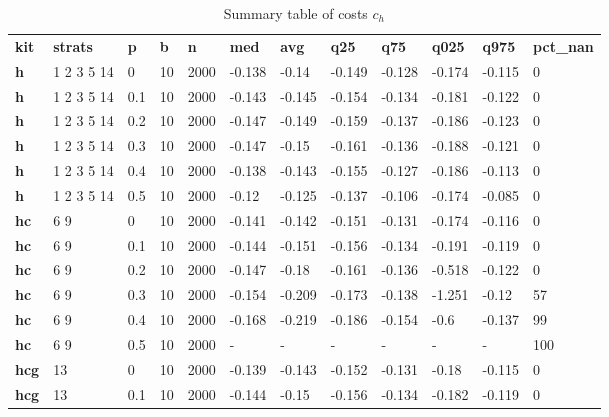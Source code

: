 \begin{longtable}[h]{|p{0.8cm}|p{1.5cm}|p{1cm}|p{1cm}|p{1cm}|p{1cm}|p{1cm}|p{1cm}|p{1cm}|p{1cm}|p{1cm}|p{1.5cm}|}
\caption{Summary table of costs $c_h$}
\label{tab:costs_mod_h} \\
      \hline
\textbf{ kit} & \textbf{ strats} & \textbf{ p} & \textbf{ b} & \textbf{ n} & \textbf{ med} & \textbf{ avg} & \textbf{ q25} & \textbf{ q75} & \textbf{ q025} & \textbf{ q975} & \textbf{ pct\_nan}
           \\
  \textbf{h   } &  1 2 3 5 14 &   0 & 10 & 2000 & -0.138 &  -0.14 & -0.149 & -0.128 & -0.174 & -0.115 &   0
           \\
  \textbf{h   } &  1 2 3 5 14 & 0.1 & 10 & 2000 & -0.143 & -0.145 & -0.154 & -0.134 & -0.181 & -0.122 &   0
           \\
  \textbf{h   } &  1 2 3 5 14 & 0.2 & 10 & 2000 & -0.147 & -0.149 & -0.159 & -0.137 & -0.186 & -0.123 &   0
           \\
  \textbf{h   } &  1 2 3 5 14 & 0.3 & 10 & 2000 & -0.147 &  -0.15 & -0.161 & -0.136 & -0.188 & -0.121 &   0
           \\
  \textbf{h   } &  1 2 3 5 14 & 0.4 & 10 & 2000 & -0.138 & -0.143 & -0.155 & -0.127 & -0.186 & -0.113 &   0
           \\
  \textbf{h   } &  1 2 3 5 14 & 0.5 & 10 & 2000 &  -0.12 & -0.125 & -0.137 & -0.106 & -0.174 & -0.085 &   0
           \\
  \textbf{hc  } &  6 9        &   0 & 10 & 2000 & -0.141 & -0.142 & -0.151 & -0.131 & -0.174 & -0.116 &   0
           \\
  \textbf{hc  } &  6 9        & 0.1 & 10 & 2000 & -0.144 & -0.151 & -0.156 & -0.134 & -0.191 & -0.119 &   0
           \\
  \textbf{hc  } &  6 9        & 0.2 & 10 & 2000 & -0.147 &  -0.18 & -0.161 & -0.136 & -0.518 & -0.122 &   0
           \\
  \textbf{hc  } &  6 9        & 0.3 & 10 & 2000 & -0.154 & -0.209 & -0.173 & -0.138 & -1.251 &  -0.12 &  57
           \\
  \textbf{hc  } &  6 9        & 0.4 & 10 & 2000 & -0.168 & -0.219 & -0.186 & -0.154 &   -0.6 & -0.137 &  99
           \\
  \textbf{hc  } &  6 9        & 0.5 & 10 & 2000 & - & - & - & - & - & - & 100
           \\
  \textbf{hcg } &  13         &   0 & 10 & 2000 & -0.139 & -0.143 & -0.152 & -0.131 &  -0.18 & -0.115 &   0
           \\
  \textbf{hcg } &  13         & 0.1 & 10 & 2000 & -0.144 &  -0.15 & -0.156 & -0.134 & -0.182 & -0.119 &   0

\end{longtable}
